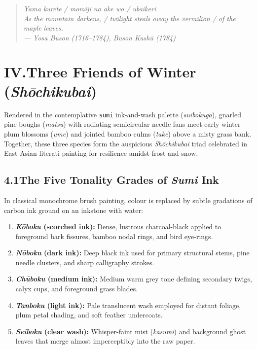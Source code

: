 \documentclass[11pt,a4paper,twoside]{article}
\begin{document}
\begin{quote}
\itshape
Yama kurete / momiji no ake wo / ubaikeri\\[2pt]
As the mountain darkens, / twilight steals away the vermilion / of the maple leaves.\\[2pt]
\upshape\small --- Yosa Buson (1716--1784), \emph{Buson Kush\=u} (1784)
\end{quote}

\clearpage

\section*{IV.\quad Three Friends of Winter (\emph{Sh\=ochikubai})}

Rendered in the contemplative \texttt{sumi} ink-and-wash palette (\emph{suibokuga}), gnarled pine boughs (\emph{matsu}) with radiating semicircular needle fans meet early winter plum blossoms (\emph{ume}) and jointed bamboo culms (\emph{take}) above a misty grass bank. Together, these three species form the auspicious \emph{Sh\=ochikubai} triad celebrated in East Asian literati painting for resilience amidst frost and snow.

\subsection*{4.1\quad The Five Tonality Grades of \emph{Sumi} Ink}

In classical monochrome brush painting, colour is replaced by subtle gradations of carbon ink ground on an inkstone with water:
\begin{enumerate}
  \item \textbf{\emph{K\=oboku} (scorched ink):} Dense, lustrous charcoal-black applied to foreground bark fissures, bamboo nodal rings, and bird eye-rings.
  \item \textbf{\emph{N\=oboku} (dark ink):} Deep black ink used for primary structural stems, pine needle clusters, and sharp calligraphy strokes.
  \item \textbf{\emph{Ch\=uboku} (medium ink):} Medium warm grey tone defining secondary twigs, calyx cups, and foreground grass blades.
  \item \textbf{\emph{Tanboku} (light ink):} Pale translucent wash employed for distant foliage, plum petal shading, and soft feather undercoats.
  \item \textbf{\emph{Seiboku} (clear wash):} Whisper-faint mist (\emph{kasumi}) and background ghost leaves that merge almost imperceptibly into the raw paper.
\end{enumerate}
\end{document}
